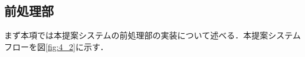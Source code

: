 \documentclass[shuuron]{kuee}
\begin{document}
\subsection{前処理部}

まず本項では本提案システムの前処理部の実装について述べる．本提案システムフローを図\ref{fig:4_2}に示す．







\end{document}
